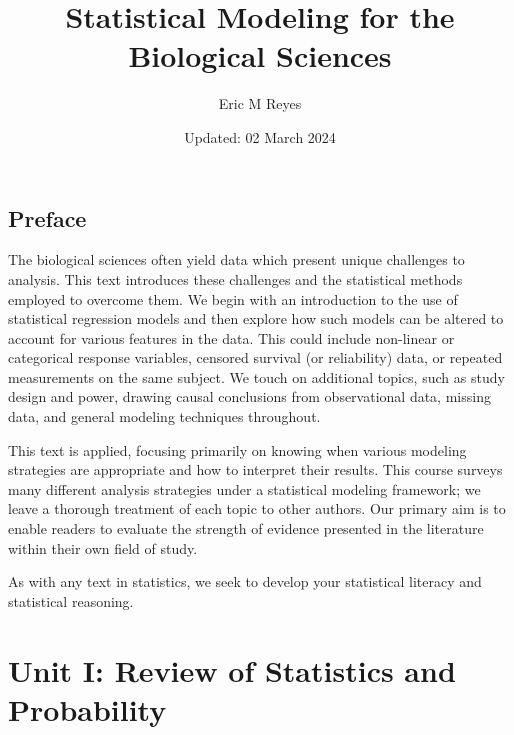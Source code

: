 \documentclass[
  letterpaper,
  DIV=11,
  numbers=noendperiod]{scrreprt}
\title{Statistical Modeling for the Biological Sciences}
\author{Eric M Reyes}
\date{Updated: 02 March 2024}
\renewcommand*\contentsname{Table of contents}
\newcommand\contentsname{Table of contents}
\theoremstyle{definition}
\theoremstyle{definition}
\theoremstyle{remark}
\begin{document}
\maketitle
\ifdefined\Shaded\renewenvironment{Shaded}{\begin{tcolorbox}[enhanced, frame hidden, boxrule=0pt, interior hidden, sharp corners, breakable, borderline west={3pt}{0pt}{shadecolor}]}{\end{tcolorbox}}\fi

\renewcommand*\contentsname{Table of contents}
{
\hypersetup{linkcolor=}
\setcounter{tocdepth}{2}
\tableofcontents
}

\hypertarget{preface}{%
\chapter*{Preface}\label{preface}}


The biological sciences often yield data which present unique challenges
to analysis. This text introduces these challenges and the statistical
methods employed to overcome them. We begin with an introduction to the
use of statistical regression models and then explore how such models
can be altered to account for various features in the data. This could
include non-linear or categorical response variables, censored survival
(or reliability) data, or repeated measurements on the same subject. We
touch on additional topics, such as study design and power, drawing
causal conclusions from observational data, missing data, and general
modeling techniques throughout.

This text is applied, focusing primarily on knowing when various
modeling strategies are appropriate and how to interpret their results.
This course surveys many different analysis strategies under a
statistical modeling framework; we leave a thorough treatment of each
topic to other authors. Our primary aim is to enable readers to evaluate
the strength of evidence presented in the literature within their own
field of study.

As with any text in statistics, we seek to develop your statistical
literacy and statistical reasoning.

\part{Unit I: Review of Statistics and Probability}
\end{document}
